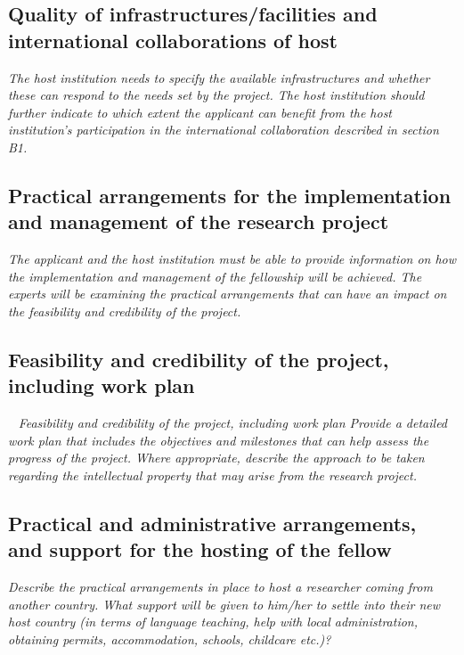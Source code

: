\documentclass[a4paper,11pt]{article}
\newenvironment{xcomment}{\em}{}
\begin{document}
\subsection{Quality of infrastructures/facilities and international collaborations of host}
\begin{xcomment}
  The host institution needs to specify the available infrastructures and whether these can respond
  to the needs set by the project. The host institution should further indicate to which extent the
  applicant can benefit from the host institution's participation in the international collaboration
  described in section B1.
\end{xcomment}

\subsection{Practical arrangements for the implementation and management of the research project }
\begin{xcomment}
  The applicant and the host institution must be able to provide information on how the
  implementation and management of the fellowship will be achieved. The experts will be
  examining the practical arrangements that can have an impact on the feasibility and credibility of
  the project.
\end{xcomment}

\subsection{Feasibility and credibility of the project, including work plan}\
\begin{xcomment}
 Feasibility and credibility of the project, including work plan
Provide a detailed work plan that includes the objectives and milestones that can help assess the
progress of the project. Where appropriate, describe the approach to be taken regarding the
intellectual property that may arise from the research project.
\end{xcomment}

\subsection{Practical and administrative arrangements, and support for the hosting of the fellow  }
\begin{xcomment}
 Describe the practical arrangements in place to host a researcher coming from another country.
What support will be given to him/her to settle into their new host country (in terms of language
teaching, help with local administration, obtaining permits, accommodation, schools, childcare
etc.)?
\end{xcomment}
\end{document}
